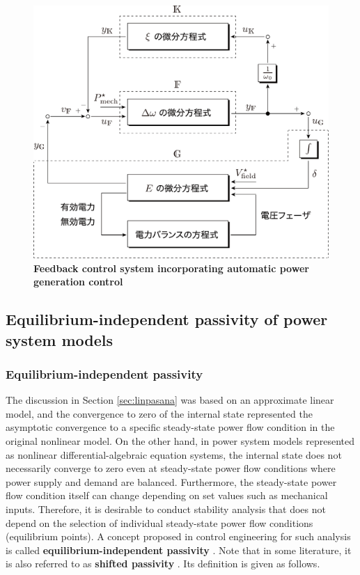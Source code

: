 \documentclass[graybox, envcountchap]{svmult}
\begin{document}
\begin{figure}[t]
\centering
\includegraphics[width = .85\linewidth]{figs/nonlinBD}
\medskip
\caption{\textbf{Feedback control system incorporating automatic power generation control}}
\label{fig:nonlinBD}
\medskip
\end{figure}



\subsection{Equilibrium-independent passivity of power system models}

\smallskip
\subsubsection{Equilibrium-independent passivity}

The discussion in Section \ref{sec:linpasana} was based on an approximate linear
model, and the convergence to zero of the internal state represented the
asymptotic convergence to a specific steady-state power flow condition in the
original nonlinear model. On the other hand, in power system models represented
as nonlinear differential-algebraic equation systems, the internal state does
not necessarily converge to zero even at steady-state power flow conditions
where power supply and demand are balanced. Furthermore, the steady-state power
flow condition itself can change depending on set values such as mechanical
inputs. Therefore, it is desirable to conduct stability analysis that does not
depend on the selection of individual steady-state power flow conditions
(equilibrium points). A concept proposed in control engineering for such
analysis is called \textbf{equilibrium-independent
passivity}
\cite{hines2011equilibrium,simpson2019equilibrium}.  Note that in some
literature, it is also referred to as \textbf{shifted passivity} \cite{monshizadeh2019conditions}.  Its definition is given as
follows.
\end{document}
